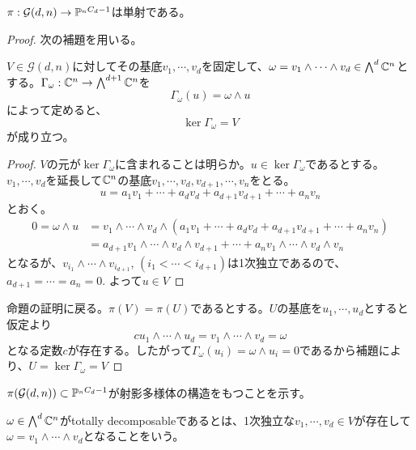 \documentclass{ltjsreport}
\begin{document}
\begin{prop}[Plucker埋め込み]\label{plucker}
  $\pi:\mathcal{G}(d,n)\rightarrow \mathbb{P}^{_{n}C_{d}-1}$は単射である。
\end{prop}

\begin{proof}
  次の補題を用いる。
  \begin{lemm}\label{ker_wedge}
    $V\in\mathcal{G}(d,n)$に対してその基底$v_1,\cdots,v_d$を固定して、$\omega=v_1\wedge\cdots\wedge v_d\in\bigwedge^d\mathbb{C}^n$とする。$\Gamma_\omega:\mathbb{C}^n\rightarrow \bigwedge^{d+1}\mathbb{C}^n$を
    \[
    \Gamma_\omega(u)=\omega\wedge u  
    \]
    によって定めると、
    \begin{equation*}
      \ker\Gamma_\omega =V
    \end{equation*}
    が成り立つ。
  \end{lemm}
  
  \begin{proof}
    $V$の元が$\ker\Gamma_\omega$に含まれることは明らか。$u\in\ker\Gamma_\omega$であるとする。$v_1,\cdots,v_d$を延長して$\mathbb{C}^n$の基底$v_1,\cdots,v_d,v_{d+1},\cdots,v_n$をとる。
    \[
    u=a_{1}v_1+\cdots+a_{d}v_d+a_{d+1}v_{d+1}+\cdots+a_nv_n  
    \]
    とおく。
    \begin{align*}
    0=\omega\wedge u
    &=v_1\wedge\cdots\wedge v_d\wedge(a_{1}v_1+\cdots+a_{d}v_d+a_{d+1}v_{d+1}+\cdots+a_nv_n )  \\
    &=a_{d+1}v_1\wedge\cdots\wedge v_d\wedge v_{d+1}
        +\cdots+
      a_{n}v_1\wedge\cdots\wedge v_d\wedge v_{n}
    \end{align*}
    となるが、$v_{i_1}\wedge\cdots\wedge v_{i_{d+1}}$, $(i_1<\cdots<i_{d+1})$は1次独立であるので、$a_{d+1}=\cdots=a_n=0$. よって$u\in V$
  \end{proof}

  命題の証明に戻る。$\pi(V)=\pi(U)$であるとする。$U$の基底を$u_1,\cdots,u_d$とすると仮定より
  \[
  cu_1\wedge\cdots\wedge u_d=v_1\wedge\cdots\wedge v_d=\omega  
  \]
  となる定数$c$が存在する。したがって$\Gamma_\omega(u_i)=\omega\wedge u_i=0$であるから補題により、$U=\ker\Gamma_\omega= V$
\end{proof}
  
$\pi(\mathcal{G}(d,n))\subset\mathbb{P}^{_{n}C_{d}-1}$が射影多様体の構造をもつことを示す。

\begin{defin}
  $\omega\in\bigwedge^d \mathbb{C}^n$がtotally decomposableであるとは、1次独立な$v_1,\cdots,v_d\in V$が存在して$\omega=v_1\wedge\cdots\wedge v_d$となることをいう。
\end{defin}
\end{document}
